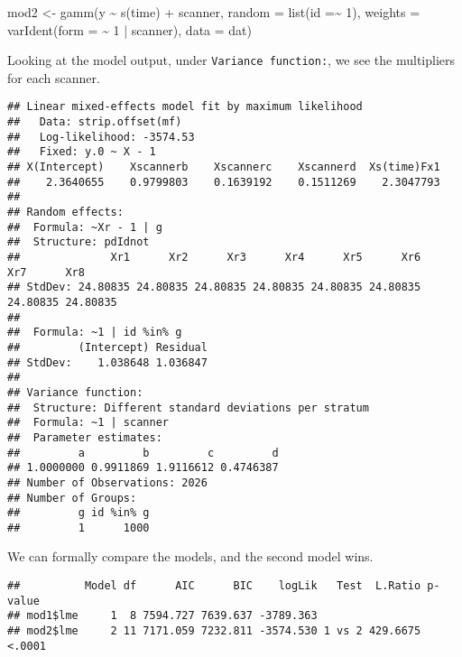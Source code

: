 \documentclass[
]{book}
\newenvironment{Shaded}{\begin{snugshade}}{\end{snugshade}}
\newcommand{\AttributeTok}[1]{\textcolor[rgb]{0.77,0.63,0.00}{#1}}
\newcommand{\DecValTok}[1]{\textcolor[rgb]{0.00,0.00,0.81}{#1}}
\newcommand{\FunctionTok}[1]{\textcolor[rgb]{0.00,0.00,0.00}{#1}}
\newcommand{\NormalTok}[1]{#1}
\newcommand{\OtherTok}[1]{\textcolor[rgb]{0.56,0.35,0.01}{#1}}
\newcommand{\SpecialCharTok}[1]{\textcolor[rgb]{0.00,0.00,0.00}{#1}}
\begin{document}
\begin{Shaded}
\begin{Highlighting}[]
\NormalTok{mod2 }\OtherTok{\textless{}{-}} \FunctionTok{gamm}\NormalTok{(y }\SpecialCharTok{\textasciitilde{}} \FunctionTok{s}\NormalTok{(time) }\SpecialCharTok{+}\NormalTok{ scanner, }\AttributeTok{random =} \FunctionTok{list}\NormalTok{(}\AttributeTok{id =}\SpecialCharTok{\textasciitilde{}} \DecValTok{1}\NormalTok{), }
             \AttributeTok{weights =} \FunctionTok{varIdent}\NormalTok{(}\AttributeTok{form =} \SpecialCharTok{\textasciitilde{}} \DecValTok{1}  \SpecialCharTok{|}\NormalTok{ scanner), }\AttributeTok{data =}\NormalTok{ dat)}
\end{Highlighting}
\end{Shaded}

Looking at the model output, under \texttt{Variance\ function:}, we see the multipliers for each scanner.

\begin{Shaded}
\end{Shaded}

\begin{verbatim}
## Linear mixed-effects model fit by maximum likelihood
##   Data: strip.offset(mf) 
##   Log-likelihood: -3574.53
##   Fixed: y.0 ~ X - 1 
## X(Intercept)    Xscannerb    Xscannerc    Xscannerd  Xs(time)Fx1 
##    2.3640655    0.9799803    0.1639192    0.1511269    2.3047793 
## 
## Random effects:
##  Formula: ~Xr - 1 | g
##  Structure: pdIdnot
##              Xr1      Xr2      Xr3      Xr4      Xr5      Xr6      Xr7      Xr8
## StdDev: 24.80835 24.80835 24.80835 24.80835 24.80835 24.80835 24.80835 24.80835
## 
##  Formula: ~1 | id %in% g
##         (Intercept) Residual
## StdDev:    1.038648 1.036847
## 
## Variance function:
##  Structure: Different standard deviations per stratum
##  Formula: ~1 | scanner 
##  Parameter estimates:
##         a         b         c         d 
## 1.0000000 0.9911869 1.9116612 0.4746387 
## Number of Observations: 2026
## Number of Groups: 
##         g id %in% g 
##         1      1000
\end{verbatim}

We can formally compare the models, and the second model wins.

\begin{Shaded}
\end{Shaded}

\begin{verbatim}
##          Model df      AIC      BIC    logLik   Test  L.Ratio p-value
## mod1$lme     1  8 7594.727 7639.637 -3789.363                        
## mod2$lme     2 11 7171.059 7232.811 -3574.530 1 vs 2 429.6675  <.0001
\end{verbatim}

  
\end{document}

